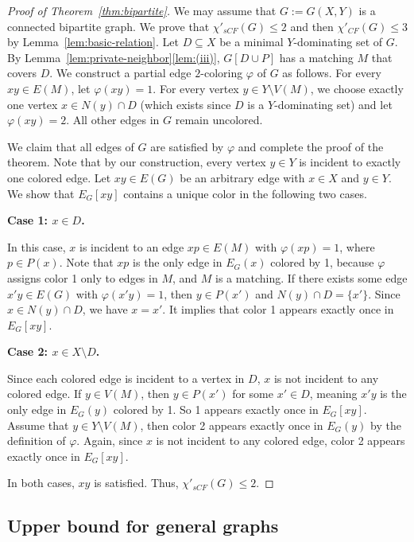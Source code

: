 \documentclass[11pt]{article}
\theoremstyle{plain}
\numberwithin{equation}{section}
\begin{document}
\begin{proof}[Proof of Theorem~\ref{thm:bipartite}]
We may assume that $G := G(X, Y)$ is a connected bipartite graph.
We prove that $\chi'_{sCF}(G)\le 2$ and then $\chi'_{CF}(G)\le 3$ by Lemma~\ref{lem:basic-relation}.
Let $D \subseteq X$ be a minimal $Y$-dominating set of $G$. By Lemma~\ref{lem:private-neighbor}\ref{lem:(iii)}, $G[D\cup P]$ has a matching $M$ that covers $D$. We construct a partial edge $2$-coloring $\varphi$ of $G$ as follows.
For every $xy\in E(M)$, let $\varphi(xy)=1$.
For every vertex $y \in Y \setminus V(M)$, we choose exactly one vertex $x \in N(y)\cap D$ (which exists since $D$ is a  $Y$-dominating set) and let $\varphi(xy)=2$.
All other edges in $G$ remain uncolored.


We claim that all edges of $G$ are satisfied by $\varphi$ and complete the proof of the theorem.
Note that by our construction, every vertex $y \in Y$ is incident to exactly one colored edge. Let $xy\in E(G)$ be an arbitrary edge with $x\in X$ and $y \in Y$. We show that $E_G[xy]$ contains a unique color in the following two cases.

{\bf Case 1: $x \in D$.}

In this case, $x$ is incident to an edge $xp\in E(M)$ with $\varphi(xp)=1$, where $p\in P(x)$. Note that $xp$ is the only edge in $E_G(x)$ colored by 1, because $\varphi$ assigns color 1 only to edges in $M$, and $M$ is a matching. If there exists some edge $x'y\in E(G)$ with $\varphi(x'y)=1$, then $y\in P(x')$ and $N(y) \cap D = \{x'\}$. Since $x\in N(y)\cap D$, we have $x = x'$. It implies that color 1 appears exactly once in $E_G[xy]$.

{\bf Case 2: $x\in X\setminus D$.}

Since each colored edge is incident to a vertex in $D$, $x$ is not incident to any colored edge.
If $y\in V(M)$, then $y\in P(x')$ for some $x' \in D$, meaning $x'y$ is the only edge in $E_G(y)$ colored by 1. So 1 appears exactly once in $E_G[xy]$. Assume that $y\in Y\setminus V(M)$, then color 2 appears exactly once in $E_G(y)$ by the definition of $\varphi$. Again, since $x$ is not incident to any colored edge, color 2 appears exactly once  in $E_G[xy]$.

In both cases, $xy$ is satisfied. Thus, $\chi'_{sCF}(G) \le 2$.
\end{proof}

\subsection{Upper bound for general graphs}\label{subsec:general}
\end{document}
